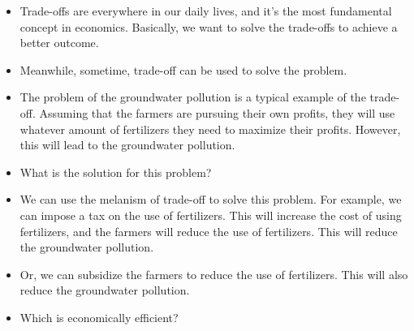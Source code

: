 \documentclass[
  letterpaper,
  DIV=11,
  numbers=noendperiod]{scrartcl}
\begin{document}
\begin{itemize}
\item
  Trade-offs are everywhere in our daily lives, and it's the most
  fundamental concept in economics. Basically, we want to solve the
  trade-offs to achieve a better outcome.
\item
  Meanwhile, sometime, trade-off can be used to solve the problem.
\item
  The problem of the groundwater pollution is a typical example of the
  trade-off. Assuming that the farmers are pursuing their own profits,
  they will use whatever amount of fertilizers they need to maximize
  their profits. However, this will lead to the groundwater pollution.
\item
  What is the solution for this problem?
\item
  We can use the melanism of trade-off to solve this problem. For
  example, we can impose a tax on the use of fertilizers. This will
  increase the cost of using fertilizers, and the farmers will reduce
  the use of fertilizers. This will reduce the groundwater pollution.
\item
  Or, we can subsidize the farmers to reduce the use of fertilizers.
  This will also reduce the groundwater pollution.
\item
  Which is economically efficient?
\end{itemize}
\end{document}
